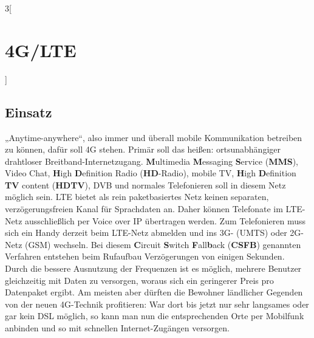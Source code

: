 \begin{multicols}{3}[\section{4G/LTE}]
\subsection*{Einsatz}
„Anytime-anywhere“, also immer und überall mobile Kommunikation betreiben zu können, dafür soll 4G stehen. Primär soll das heißen: ortsunabhängiger drahtloser Breitband-Internetzugang. \textbf{M}ultimedia \textbf{M}essaging \textbf{S}ervice (\textbf{MMS}), Video Chat, \textbf{H}igh \textbf{D}efinition Radio (\textbf{HD}-Radio), mobile TV, \textbf{H}igh \textbf{D}efinition \textbf{TV} content (\textbf{HDTV}), DVB und normales Telefonieren soll in diesem Netz möglich sein.
LTE bietet als rein paketbasiertes Netz keinen separaten, verzögerungsfreien Kanal für Sprachdaten an. Daher können Telefonate im LTE-Netz ausschließlich per Voice over IP übertragen werden. Zum Telefonieren muss sich ein Handy derzeit beim LTE-Netz abmelden und ins 3G- (UMTS) oder 2G-Netz (GSM) wechseln. Bei diesem \textbf{C}ircuit \textbf{S}witch \textbf{F}all\textbf{b}ack (\textbf{CSFB}) genannten Verfahren entstehen beim Rufaufbau Verzögerungen von einigen Sekunden. ~\cite{4GLTE.5}
Durch die bessere Ausnutzung der Frequenzen ist es möglich, mehrere Benutzer gleichzeitig mit Daten zu versorgen, woraus sich ein geringerer Preis pro Datenpaket ergibt. 
Am meisten aber dürften die Bewohner ländlicher Gegenden von der neuen 4G-Technik profitieren: War dort bis jetzt nur sehr langsames oder gar kein DSL möglich, so kann man nun die entsprechenden Orte per Mobilfunk anbinden und so mit schnellen Internet-Zugängen versorgen. ~\cite{4GLTE.6}

\end{multicols}

\newpage

